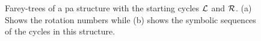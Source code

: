 \begin{figure}
{	}
	\qquad
	\caption[Farey-trees of a  structure between $\L$ and $\R$]{
		Farey-trees of a \gls{pa} structure with the starting cycles $\L$ and $\R$.
		(a) Shows the rotation numbers while (b) shows the symbolic sequences of the cycles in this structure.
	}
	\label{fig:state.discont.adding.farey}
\end{figure}
